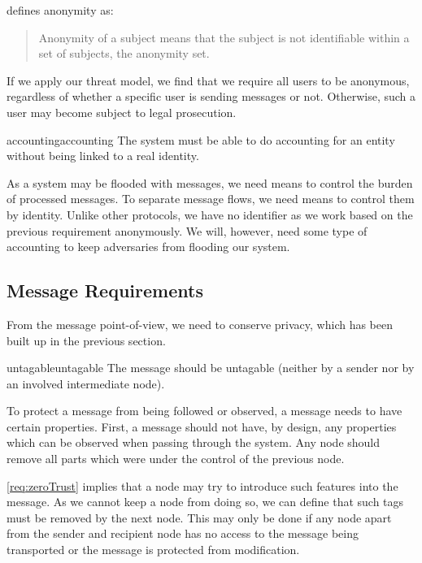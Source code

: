 \cite{anonTerminology} defines anonymity as:
\begin{quote}
	Anonymity of a subject means that the subject is not identifiable within a set of subjects, the anonymity set.
\end{quote}

If we apply our threat model, we find that we require all users to be anonymous, regardless of whether a specific user is sending messages or not. Otherwise, such a user may become subject to legal prosecution. 

\begin{requirement}{accounting}{accounting}
	The system must be able to do accounting for an entity without being linked to a real identity.
\end{requirement}

As a system may be flooded with messages, we need means to control the burden of processed messages. To separate message flows, we need means to control them by identity. Unlike other protocols, we have no identifier as we work based on the previous requirement anonymously. We will, however, need some type of accounting to keep adversaries from flooding our system.

\subsection{Message Requirements}
From the message point-of-view, we need to conserve privacy, which has been built up in the previous section.

\begin{requirement}{untagable}{untagable}
	The message should be untagable (neither by a sender nor by an involved intermediate node).
\end{requirement}

To protect a message from being followed or observed, a message needs to have certain properties. First, a message should not have, by design, any properties which can be observed when passing through the system. Any node should remove all parts which were under the control of the previous node.

\ref{req:zeroTrust} implies that a node may try to introduce such features into the message. As we cannot keep a node from doing so, we can define that such tags must be removed by the next node. This may only be done if any node apart from the sender and recipient node has no access to the message being transported or the message is protected from modification.

